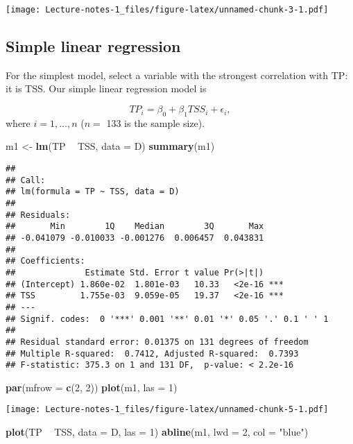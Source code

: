 \documentclass[
]{book}
\newenvironment{Shaded}{\begin{snugshade}}{\end{snugshade}}
\newcommand{\DataTypeTok}[1]{\textcolor[rgb]{0.13,0.29,0.53}{#1}}
\newcommand{\DecValTok}[1]{\textcolor[rgb]{0.00,0.00,0.81}{#1}}
\newcommand{\KeywordTok}[1]{\textcolor[rgb]{0.13,0.29,0.53}{\textbf{#1}}}
\newcommand{\NormalTok}[1]{#1}
\newcommand{\OperatorTok}[1]{\textcolor[rgb]{0.81,0.36,0.00}{\textbf{#1}}}
\newcommand{\StringTok}[1]{\textcolor[rgb]{0.31,0.60,0.02}{#1}}
\begin{document}
\texttt{[image: Lecture-notes-1\_files/figure-latex/unnamed-chunk-3-1.pdf]}

\hypertarget{simple-linear-regression}{%
\subsection{Simple linear regression}\label{simple-linear-regression}}

For the simplest model, select a variable with the strongest correlation with TP: it is TSS.
Our simple linear regression model is

\[TP_i = \beta_0 + \beta_1 TSS_i + \epsilon_i,\]
where \(i = 1,\ldots,n\) (\(n =\) 133 is the sample size).

\begin{Shaded}
\begin{Highlighting}[]
\NormalTok{m1 <-}\StringTok{ }\KeywordTok{lm}\NormalTok{(TP }\OperatorTok{~}\StringTok{ }\NormalTok{TSS, }\DataTypeTok{data =}\NormalTok{ D)}
\KeywordTok{summary}\NormalTok{(m1)}
\end{Highlighting}
\end{Shaded}

\begin{verbatim}
## 
## Call:
## lm(formula = TP ~ TSS, data = D)
## 
## Residuals:
##       Min        1Q    Median        3Q       Max 
## -0.041079 -0.010033 -0.001276  0.006457  0.043831 
## 
## Coefficients:
##              Estimate Std. Error t value Pr(>|t|)    
## (Intercept) 1.860e-02  1.801e-03   10.33   <2e-16 ***
## TSS         1.755e-03  9.059e-05   19.37   <2e-16 ***
## ---
## Signif. codes:  0 '***' 0.001 '**' 0.01 '*' 0.05 '.' 0.1 ' ' 1
## 
## Residual standard error: 0.01375 on 131 degrees of freedom
## Multiple R-squared:  0.7412, Adjusted R-squared:  0.7393 
## F-statistic: 375.3 on 1 and 131 DF,  p-value: < 2.2e-16
\end{verbatim}

\begin{Shaded}
\begin{Highlighting}[]
\KeywordTok{par}\NormalTok{(}\DataTypeTok{mfrow =} \KeywordTok{c}\NormalTok{(}\DecValTok{2}\NormalTok{, }\DecValTok{2}\NormalTok{))}
\KeywordTok{plot}\NormalTok{(m1, }\DataTypeTok{las =} \DecValTok{1}\NormalTok{)}
\end{Highlighting}
\end{Shaded}

\texttt{[image: Lecture-notes-1\_files/figure-latex/unnamed-chunk-5-1.pdf]}

\begin{Shaded}
\begin{Highlighting}[]
\KeywordTok{plot}\NormalTok{(TP }\OperatorTok{~}\StringTok{ }\NormalTok{TSS, }\DataTypeTok{data =}\NormalTok{ D, }\DataTypeTok{las =} \DecValTok{1}\NormalTok{)}
\KeywordTok{abline}\NormalTok{(m1, }\DataTypeTok{lwd =} \DecValTok{2}\NormalTok{, }\DataTypeTok{col =} \StringTok{"blue"}\NormalTok{)}
\end{Highlighting}
\end{Shaded}
\end{document}
